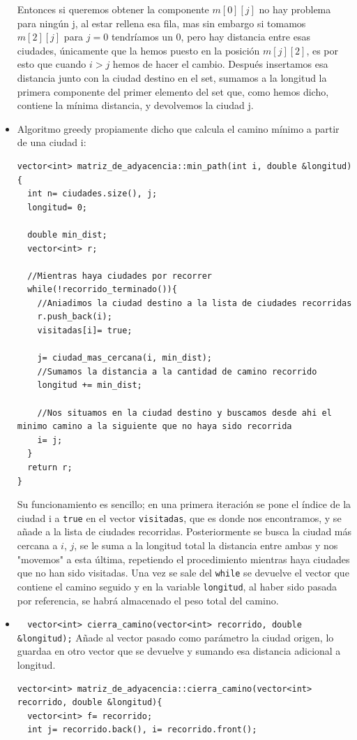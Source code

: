 \documentclass[12pt]{article}
\begin{document}
\begin{itemize}[wide, nosep, labelindent = 0pt, topsep = 1ex]
Entonces si queremos obtener la componente $m[0][j]$ no hay problema para ningún j, al estar rellena esa fila, mas sin embargo si tomamos $m[2][j]$ para $j= 0$ tendríamos un 0, pero hay distancia entre esas ciudades, únicamente que la hemos puesto en la posición $m[j][2]$, es por esto que cuando $i>j$ hemos de hacer el cambio. Después insertamos esa distancia junto con la ciudad destino en el set, sumamos a la longitud la primera componente del primer elemento del set que, como hemos dicho, contiene la mínima distancia, y devolvemos la ciudad j.

\item Algoritmo greedy propiamente dicho que calcula el camino mínimo a partir de una ciudad i: 
\begin{lstlisting}
vector<int> matriz_de_adyacencia::min_path(int i, double &longitud){
  int n= ciudades.size(), j;
  longitud= 0;

  double min_dist;
  vector<int> r;

  //Mientras haya ciudades por recorrer
  while(!recorrido_terminado()){
    //Aniadimos la ciudad destino a la lista de ciudades recorridas
    r.push_back(i);
    visitadas[i]= true;

    j= ciudad_mas_cercana(i, min_dist);
    //Sumamos la distancia a la cantidad de camino recorrido
    longitud += min_dist;

    //Nos situamos en la ciudad destino y buscamos desde ahi el minimo camino a la siguiente que no haya sido recorrida
    i= j;
  }
  return r;
}
\end{lstlisting}
Su funcionamiento es sencillo; en una primera iteración se pone el índice de la ciudad i a \verb|true| en el vector \verb|visitadas|, que es donde nos encontramos, y se añade a la lista de ciudades recorridas. Posteriormente se busca la ciudad más cercana a $i$, $j$, se le suma a la longitud total la distancia entre ambas y nos "movemos" a esta última, repetiendo el procedimiento mientras haya ciudades que no han sido visitadas. Una vez se sale del \verb|while| se devuelve el vector que contiene el camino seguido y en la variable \verb|longitud|, al haber sido pasada por referencia, se habrá almacenado el peso total del camino.
\item \verb|  vector<int> cierra_camino(vector<int> recorrido, double &longitud);| Añade al vector pasado como parámetro la ciudad origen, lo guardaa en otro vector que se devuelve y sumando esa distancia adicional a longitud. 

\begin{lstlisting}
vector<int> matriz_de_adyacencia::cierra_camino(vector<int> recorrido, double &longitud){
  vector<int> f= recorrido;
  int j= recorrido.back(), i= recorrido.front();


\end{lstlisting}
\end{itemize}
\end{document}
